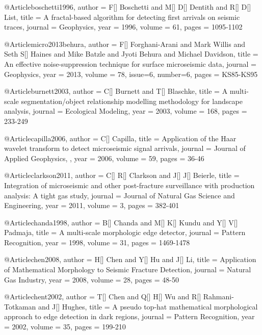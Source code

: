   @Article{boschetti1996,
  author = 	 {F[] Boschetti and M[] D[] Dentith and R[] D[] List},
  title = 	 {A fractal-based algorithm for detecting first arrivals on seismic traces},
  journal = 	 {Geophysics},
  year = 	 1996,
  volume = 	 61,
  pages = 	 {1095-1102}}

  @Article{micro2013behura,
  author = 	 {F[] Forghani-Arani and Mark Willis and Seth S[] Haines and Mike Batzle and Jyoti Behura and Michael Davidson},
  title = 	 {An effective noise-suppression technique for surface microseismic data},
  journal = 	 {Geophysics},
  year = 	 2013,
  volume = 	 78,
  issue=6,
  number=6,
  pages = 	 {KS85-KS95}}
    
  
  @Article{burnett2003,
  author = 	 {C[] Burnett and T[] Blaschke},
  title = 	 {A multi-scale segmentation/object relationship modelling methodology for landscape analysis},
  journal = 	 {Ecological Modeling},
  year = 	 2003,
  volume = 	 168,
  pages = 	 {233-249}}
  
   @Article{capilla2006,
  author = 	 {C[] Capilla},
  title = 	 {Application of the Haar wavelet transform to detect microseismic signal arrivals},
  journal = 	 {Journal of Applied Geophysics,
},
  year = 	 2006,
  volume = 	 59,
  pages = 	 {36-46}}
  
    @Article{clarkson2011,
  author = 	 {C[] R[] Clarkson and J[] J[] Beierle},
  title = 	 {Integration of microseismic and other post-fracture surveillance
with production analysis: A tight gas study},
  journal = 	 {Journal of Natural Gas Science and Engineering},
  year = 	 2011,
  volume = 	 3,
  pages = 	 {382-401}} 
  
    @Article{chanda1998,
  author = 	 {B[] Chanda and M[] K[] Kundu and Y[] V[] Padmaja},
  title = 	 {A multi-scale morphologic edge detector},
  journal = 	 {Pattern Recognition},
  year = 	 1998,
  volume = 	 31,
  pages = 	 {1469-1478}} 
  
    @Article{chen2008,
  author = 	 {H[] Chen and Y[] Hu and J[] Li},
  title = 	 {Application of Mathematical Morphology to Seismic Fracture Detection},
  journal = 	 {Natural Gas Industry},
  year = 	 2008,
  volume = 	 28,
  pages = 	 {48-50}}   
  
    @Article{chent2002,
  author = 	 {T[] Chen and Q[] H[] Wu and R[] Rahmani-Totkaman and J[] Hughes},
  title = 	 {A pseudo top-hat mathematical
morphological approach to edge detection in dark regions},
  journal = 	 {Pattern Recognition},
  year = 	 2002,
  volume = 	 35,
  pages = 	 {199-210}}   
  
